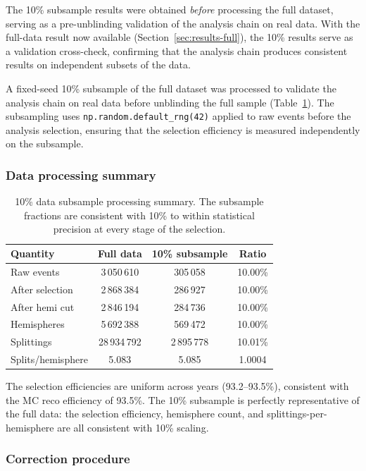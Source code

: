\documentclass[11pt,a4paper]{article}
\begin{document}
The 10\% subsample results were obtained \emph{before} processing the
full dataset, serving as a pre-unblinding validation of the analysis
chain on real data.  With the full-data result now available
(Section~\ref{sec:results-full}), the 10\% results serve as a
validation cross-check, confirming that the analysis chain produces
consistent results on independent subsets of the data.

A fixed-seed 10\% subsample of the full dataset was processed to validate
the analysis chain on real data before unblinding the full sample
(Table~\ref{tbl:10pct-summary}).
The subsampling uses \texttt{np.random.default\_rng(42)} applied to raw
events before the analysis selection, ensuring that the selection
efficiency is measured independently on the subsample.

\subsubsection{Data processing summary}

\begin{table}[htbp]
\centering
\caption{10\% data subsample processing summary.  The subsample
  fractions are consistent with 10\% to within statistical precision
  at every stage of the selection.}
\label{tbl:10pct-summary}
\begin{tabular}{lccc}
\toprule
Quantity & Full data & 10\% subsample & Ratio \\
\midrule
Raw events & 3\,050\,610 & 305\,058 & 10.00\% \\
After selection & 2\,868\,384 & 286\,927 & 10.00\% \\
After hemi cut & 2\,846\,194 & 284\,736 & 10.00\% \\
Hemispheres & 5\,692\,388 & 569\,472 & 10.00\% \\
Splittings & 28\,934\,792 & 2\,895\,778 & 10.01\% \\
Splits/hemisphere & 5.083 & 5.085 & 1.0004 \\
\bottomrule
\end{tabular}
\end{table}

The selection efficiencies are uniform across years (93.2--93.5\%),
consistent with the MC reco efficiency of 93.5\%.  The 10\% subsample
is perfectly representative of the full data: the selection efficiency,
hemisphere count, and splittings-per-hemisphere are all consistent with
10\% scaling.

\subsubsection{Correction procedure}
\end{document}
